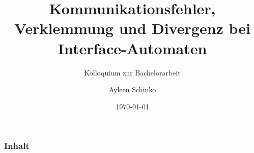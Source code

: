 \documentclass[mathserif, xcolor=dvipsnames, notheorems, compress, handout]{beamer}
\title{Kommunikationsfehler, Verklemmung und Divergenz bei Interface-Automaten}
\subtitle{Kolloquium zur Bachelorarbeit}
\author{Ayleen Schinko}
\date{\today}
\begin{document}
\begin{frame}[plain]
\maketitle
\end{frame}

\begin{frame}
  \frametitle{Inhalt}
  \tableofcontents{}
\end{frame}








\end{document}
